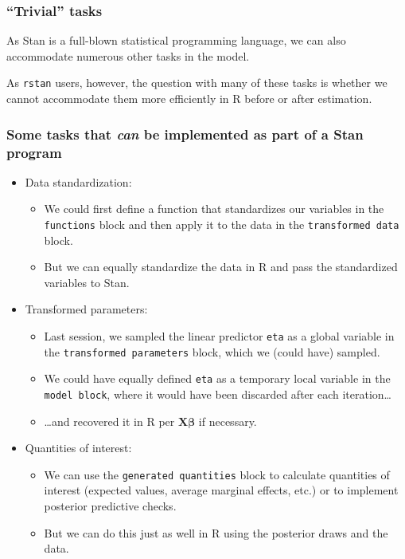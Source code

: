 \documentclass[
  11pt,
]{article}
\providecommand{\tightlist}{%
  \setlength{\itemsep}{0pt}\setlength{\parskip}{0pt}}
\begin{document}
\hypertarget{trivial-tasks}{%
\subsubsection{``Trivial'' tasks}\label{trivial-tasks}}

As Stan is a full-blown statistical programming language, we can also accommodate numerous other tasks in the model.

As \texttt{rstan} users, however, the question with many of these tasks is whether we cannot accommodate them more efficiently in R before or after estimation.

\hypertarget{some-tasks-that-can-be-implemented-as-part-of-a-stan-program}{%
\subsubsection{\texorpdfstring{Some tasks that \emph{can} be implemented as part of a Stan program}{Some tasks that can be implemented as part of a Stan program}}\label{some-tasks-that-can-be-implemented-as-part-of-a-stan-program}}

\begin{itemize}
\tightlist
\item
  Data standardization:

  \begin{itemize}
  \tightlist
  \item
    We could first define a function that standardizes our variables in the \texttt{functions} block and then apply it to the data in the \texttt{transformed\ data} block.
  \item
    But we can equally standardize the data in R and pass the standardized variables to Stan.
  \end{itemize}
\item
  Transformed parameters:

  \begin{itemize}
  \tightlist
  \item
    Last session, we sampled the linear predictor \texttt{eta} as a global variable in the \texttt{transformed\ parameters} block, which we (could have) sampled.
  \item
    We could have equally defined \texttt{eta} as a temporary local variable in the \texttt{model\ block}, where it would have been discarded after each iteration\ldots{}
  \item
    \ldots and recovered it in R per \(\mathbf{X\beta}\) if necessary.
  \end{itemize}
\item
  Quantities of interest:

  \begin{itemize}
  \tightlist
  \item
    We can use the \texttt{generated\ quantities} block to calculate quantities of interest (expected values, average marginal effects, etc.) or to implement posterior predictive checks.
  \item
    But we can do this just as well in R using the posterior draws and the data.
  \end{itemize}
\end{itemize}
\end{document}
